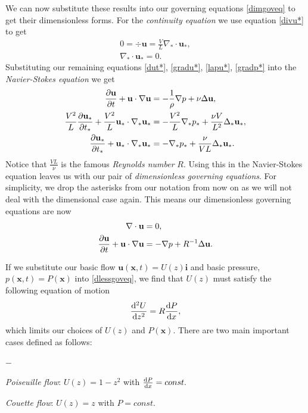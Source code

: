 We can now substitute these results into our governing equations \eqref{dimgoveq} to get their dimensionless forms. For the \emph{continuity equation} we use equation \eqref{divu*} to get
\begin{gather}
    0 = \div{\mathbf{u}} = \frac{V}{L} \nabla_* \cdot {\mathbf{u_*}}, \\
    \nabla_* \cdot {\mathbf{u_*}} = 0.
\end{gather}
Substituting our remaining equations \eqref{dut*}, \eqref{gradu*}, \eqref{lapu*}, \eqref{gradp*} into the \emph{Navier-Stokes equation} we get
\begin{align}
        \pdv{\mathbf{u}}{t} + \mathbf{u} \cdot \nabla \mathbf{u} &= - \frac{1}{\rho} \nabla p + \nu \Delta \mathbf{u}, \nonumber\\
        \frac{V^2}{L} \pdv{\mathbf{u_*}}{t_*} + \frac{V^2}{L} \mathbf{u_*} \cdot \nabla_* \mathbf{u_*} &= -\frac{V^2}{L} \nabla_* p_* + \frac{\nu V}{L^2} \Delta_* \mathbf{u_*}, \nonumber\\
        \pdv{\mathbf{u_*}}{t_*} + \mathbf{u_*} \cdot \nabla_* \mathbf{u_*} &= -\nabla_* p_* + \frac{\nu}{V L} \Delta_* \mathbf{u_*}.
\end{align}
Notice that $ \frac{V L}{\nu} $ is the famous \emph{Reynolds number} $ R $. Using this in the Navier-Stokes equation leaves us with our pair of \emph{dimensionless governing equations}. For simplicity, we drop the asterisks from our notation from now on as we will not deal with the dimensional case again. This means our dimensionless governing equations are now
\begin{align}
    \nabla \cdot \mathbf{u} &= 0, \nonumber\\
    \pdv{\mathbf{u}}{t} + \mathbf{u} \cdot \nabla \mathbf{u} &= -\nabla p + R^{-1} \Delta \mathbf{u}.
\label{dlessgoveq}
\end{align}

If we substitute our basic flow $ \mathbf{u}(\mathbf{x}, t) = U(z) \mathbf{i} $ and basic pressure, $ p (\mathbf{x}, t) = P(\mathbf{x}) $ into \eqref{dlessgoveq}, we find that $ U(z) $ must satisfy the following equation of motion 
\begin{equation}
    \dv[2]{U}{z} = R \dv{P}{x},
\end{equation}
which limits our choices of $ U (z) $ and $ P (\mathbf{x})$. There are two main important cases defined as follows:
\begin{list}{$-$}{\leftmargin=1cm}
    \item \emph{Poiseuille flow}: $ U(z) = 1 - z^2 $ with $ \dv{P}{x} = const. $
    \item \emph{Couette flow}: $ U(z) = z $ with $ P = const. $
\end{list}

